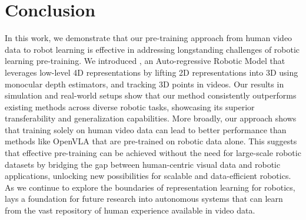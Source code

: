 \section{Conclusion} 
\label{sec:conclusion}

In this work, we demonstrate that our pre-training approach from human video data to robot learning is effective in addressing longstanding challenges of robotic learning pre-training. We introduced \smodel{}, an Auto-regressive Robotic Model that leverages low-level 4D representations by lifting 2D representations into 3D using monocular depth estimators, and tracking 3D points in videos. Our results in simulation and real-world setups show that our method consistently outperforms existing methods across diverse robotic tasks, showcasing its superior transferability and generalization capabilities. More broadly, our approach shows that training solely on human video data can lead to better performance than methods like OpenVLA that are pre-trained on robotic data alone. This suggests that effective pre-training can be achieved without the need for large-scale robotic datasets by bridging the gap between human-centric visual data and robotic applications, unlocking new possibilities for scalable and data-efficient robotics. 
As we continue to explore the boundaries of representation learning for robotics, \smodel{} lays a foundation for future research into autonomous systems that can learn from the vast repository of human experience available in video data.





